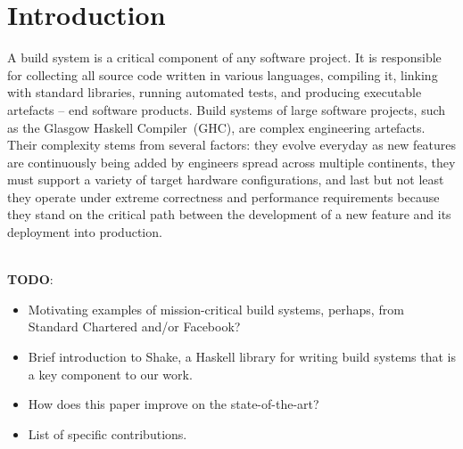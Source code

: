 \section{Introduction}

A build system is a critical component of any software project.
It is responsible for collecting all source code written in various languages,
compiling it, linking with standard libraries, running automated tests, and
producing executable artefacts -- end software products. Build systems of large
software projects, such as the Glasgow Haskell Compiler~(GHC), are complex
engineering artefacts. Their complexity stems from several factors: they evolve everyday as
new features are continuously being added by engineers spread across multiple
continents, they must support a variety of target hardware configurations, and
last but not least they operate under extreme correctness and performance
requirements because they stand on the critical path between the development of
a new feature and its deployment into production. 

~\\
\textbf{TODO}:
\begin{itemize}
  \item Motivating examples of mission-critical build systems, perhaps, from
  Standard Chartered and/or Facebook?
  \item Brief introduction to Shake, a Haskell library for writing build systems
  that is a key component to our work.
  \item How does this paper improve on the state-of-the-art?
  \item List of specific contributions.
\end{itemize}

